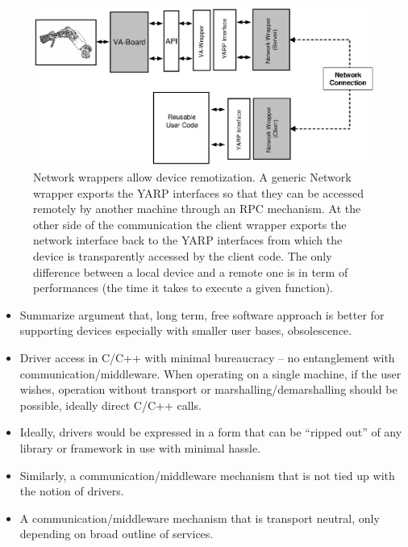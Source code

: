 \begin{figure}[tbp]
\centerline{
\includegraphics[width=24cm]{fig-devices3.eps}
}
\caption{Network wrappers allow device remotization. A generic Network 
wrapper exports the YARP interfaces so that they can be accessed remotely 
by another machine through an RPC mechanism. At the other side of the 
communication the client wrapper exports the network interface back 
to the YARP interfaces from which the device is transparently accessed 
by the client code. The only difference between a local device and a 
remote one is in term of performances (the time it takes to execute 
a given function).
}\label{fig:devices3}
\end{figure}

\begin{itemize}

\item Summarize argument that, long term, free software approach 
is better for supporting devices especially with smaller user
bases, obsolescence.


\item Driver access in C/C++ with minimal bureaucracy -- no
entanglement with communication/middleware.  When operating
on a single machine, if the user wishes, operation without
transport or marshalling/demarshalling should be possible, ideally
direct C/C++ calls.

\item Ideally, drivers would be expressed in a form that
can be ``ripped out'' of any library or framework in use
with minimal hassle.

\item Similarly, a communication/middleware mechanism that is 
not tied up with the notion of drivers.

\item A communication/middleware mechanism that is transport
neutral, only depending on broad outline of services.


\end{itemize}





